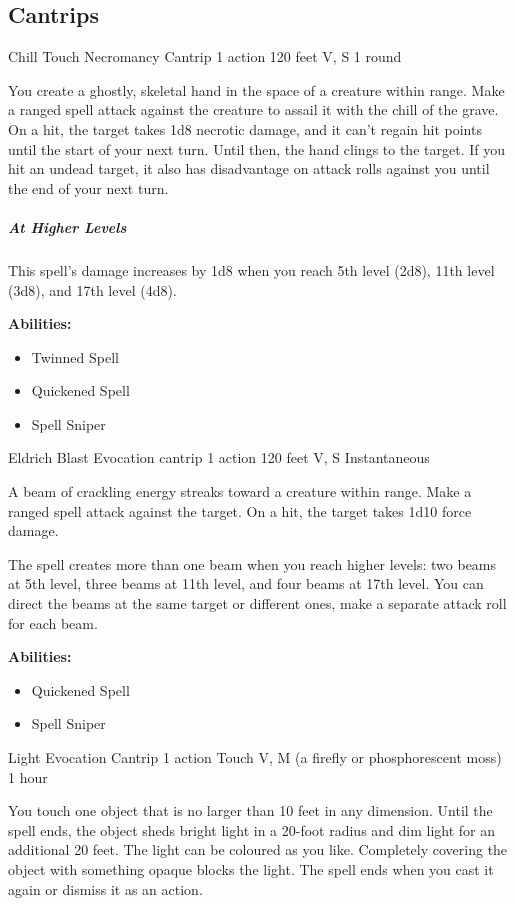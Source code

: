 \documentclass[a4paper,openany,twocolumn]{book}
\begin{document}
\subsection*{Cantrips}

\DndSpellHeader
  {Chill Touch}
  {Necromancy Cantrip}
  {1 action}
  {120 feet}
  {V, S}
  {1 round}

You create a ghostly, skeletal hand in the space of a creature within range. Make a ranged spell attack against the creature to assail it with the chill of the grave. On a hit, the target takes 1d8 necrotic damage, and it can't regain hit points until the start of your next turn. Until then, the hand clings to the target. If you hit an undead target, it also has disadvantage on attack rolls against you until the end of your next turn.
    
\subparagraph*{At Higher Levels} This spell's damage increases by 1d8 when you reach 5th level (2d8), 11th level (3d8), and 17th level (4d8).

\textbf{Abilities:}
\begin{itemize}
  \item Twinned Spell
  \item Quickened Spell
  \item Spell Sniper
\end{itemize}


\DndSpellHeader
  {Eldrich Blast}
  {Evocation cantrip}
  {1 action}
  {120 feet}
  {V, S}
  {Instantaneous}

A beam of crackling energy streaks toward a creature within range. Make a ranged spell attack against the target. On a hit, the target takes 1d10 force damage.

The spell creates more than one beam when you reach higher levels: two beams at 5th level, three beams at 11th level, and four beams at 17th level. You can direct the beams at the same target or different ones, make a separate attack roll for each beam.

\textbf{Abilities:}
\begin{itemize}
  \item Quickened Spell
  \item Spell Sniper
\end{itemize}

\DndSpellHeader
  {Light}
  {Evocation Cantrip}
  {1 action}
  {Touch}
  {V, M (a firefly or phosphorescent moss)}
  {1 hour}

You touch one object that is no larger than 10 feet in any dimension. Until the spell ends, the object sheds bright light in a 20-foot radius and dim light for an additional 20 feet. The light can be coloured as you like. Completely covering the object with something opaque blocks the light. The spell ends when you cast it again or dismiss it as an action.
\end{document}
